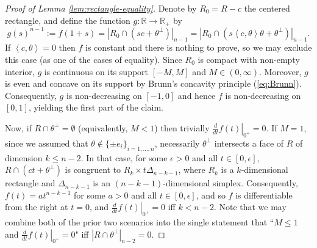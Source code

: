 \documentclass[11pt]{article}
\theoremstyle{definition}
\theoremstyle{proof}
\newcommand{\dt}[1]{\left . \frac{d}{dt} #1 \right |_{0^+}}
\DeclareMathOperator{\+}{\mathop{\tilde{+}}}
\newcommand{\scalar}[1]{\left \langle #1 \right \rangle}
\newcommand{\R}{\mathbb{R}}
\newcommand{\eps}{\epsilon}
\numberwithin{equation}{section}
\numberwithin{equation}{section}
\begin{document}
 
 \begin{proof}[Proof of Lemma \ref{lem:rectangle-equality}]
 Denote by $R_0 = R - c$ the centered rectangle, and define the function $g : \R \rightarrow \R_+$ by
\[
 g(s)^{n-1} := f(1+s) = |R_0 \cap (s c + \theta^{\perp})|_{n-1} = |R_0 \cap (s \scalar{c,\theta} \theta + \theta^{\perp})|_{n-1} .
\]
If $\scalar{c,\theta} = 0$ then $f$ is constant and there is nothing to prove, so we may exclude this case (as one of the cases of equality). 
Since $R_0$ is compact with non-empty interior, $g$ is continuous on its support $[-M,M]$ and $M \in (0,\infty)$. 
Moreover, $g$ is even and concave on its support by Brunn's concavity principle (\ref{eq:Brunn}). 
Consequently, $g$ is non-decreasing on $[-1,0]$ and hence $f$ is non-decreasing on $[0,1]$, yielding the first part of the claim. 

Now, if $R \cap \theta^{\perp} = \emptyset$ (equivalently, $M < 1$) then trivially $\dt{f(t)} = 0$. 
If $M=1$, since we assumed that $\theta \notin \{\pm e_i\}_{i=1,\ldots,n}$, necessarily $\theta^{\perp}$ intersects a face of $R$ of dimension $k \leq n-2$. In that case, for some $\eps > 0$ and all $t \in [0,\eps]$, $R \cap (c t + \theta^{\perp})$ is congruent to $R_k \times t \Delta_{n-k-1}$, where $R_k$ is a $k$-dimensional rectangle and $\Delta_{n-k-1}$ is an $(n-k-1)$-dimensional simplex. 
  Consequently, $f(t) = a t^{n-k-1}$ for some $a > 0$ and all $t \in [0,\eps]$, and so $f$ is differentiable from the right at $t=0$, and $\dt{f(t)} = 0$ iff $k < n-2$. Note that we may combine both of the prior two scenarios into the single statement that ``$M \leq 1$ and $\dt{f(t)} = 0$" iff $|R \cap \theta^{\perp}|_{n-2} = 0$. 


\end{proof}
\end{document}
